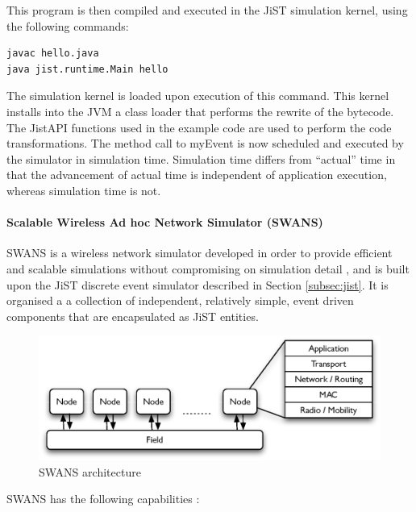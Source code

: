 This program is then compiled and executed in the JiST simulation
kernel, using the following commands:

  
\begin{lstlisting}[frame=trbl, basewidth={0.55em, 0.6em}, captionpos=b, 
basicstyle=\ttfamily\footnotesize, breaklines, caption = Execution of the
program in the JiST, label = listing:JiST ]  
javac hello.java
java jist.runtime.Main hello
\end{lstlisting}


The simulation kernel is loaded upon execution of this command. This kernel
installs into the JVM a class loader that performs the rewrite of the bytecode.
The JistAPI functions used in the example code are used to perform the
code transformations. The method call to myEvent is now scheduled and executed
by the simulator in simulation time. Simulation time differs from ``actual''
time in that the advancement of actual time is independent of application
execution, whereas simulation time is not. 
 
\paragraph{Scalable Wireless Ad hoc Network Simulator (SWANS)}
SWANS is a wireless network simulator developed in order to provide efficient
and scalable simulations without compromising on simulation detail \cite{barr_SWANS},
and is built upon the JiST discrete event simulator described in Section \ref{subsec:jist}. 
It is organised a a collection of independent, relatively simple, event driven
components that are encapsulated as JiST entities. 

\begin{figure}[h]
\centering
\includegraphics[width=\textwidth]{img/SWANS_architecture.eps} 
\caption[SWANS architecture]{SWANS architecture}
\label{Fig:SWANS_architecture}
\end{figure} 
  
SWANS has the following capabilities \cite{barr_SWANS}:

